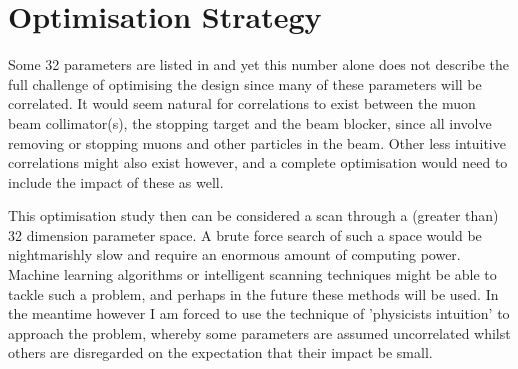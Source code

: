 \section{Optimisation Strategy}

Some 32 parameters are listed in  and yet this number alone does not describe the full challenge of optimising the \phaseII design since many of these parameters will be correlated.
It would seem natural for correlations to exist between the muon beam collimator(s), the stopping target and the beam blocker, since all involve removing or stopping muons and other particles in the beam.
Other less intuitive correlations might also exist however, and a complete optimisation would need to include the impact of these as well.

This optimisation study then can be considered a scan through a (greater than) 32 dimension parameter space.
A brute force search of such a space would be nightmarishly slow and require an enormous amount of computing power.
Machine learning algorithms or intelligent scanning techniques might be able to tackle such a problem, and perhaps in the future these methods will be used.
In the meantime however I am forced to use the technique of 'physicists intuition' to approach the problem, whereby some parameters are assumed uncorrelated whilst others are disregarded on the expectation that their impact be small.

